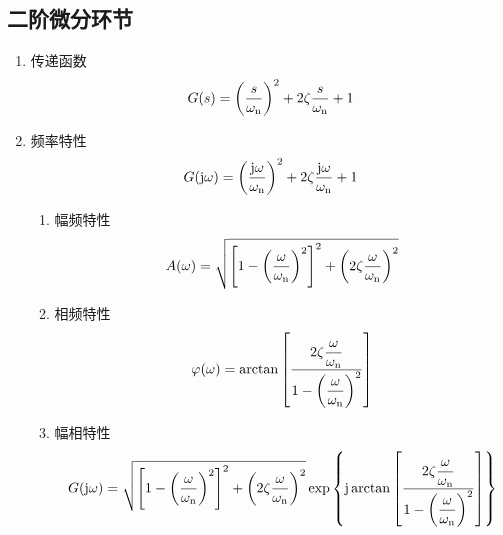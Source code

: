 \subsection{二阶微分环节}
\begin{enumerate}[1.]
	\item 传递函数
	\vspace*{-0.5em}
	\begin{align}
		G(s) = \left(\dfrac{s}{\omega_{\rm{n}}}\right)^2 + 2 \zeta \dfrac{s}{\omega_{\rm{n}}} + 1
	\end{align}
	\vspace*{-3em}
	
	\item 频率特性
	\vspace*{-0.5em}
	\begin{align}
		G(\text{j}  \omega) =  \left(\dfrac{\text{j} \omega}{\omega_{\rm{n}}}\right)^2 + 2 \zeta \dfrac{\text{j} \omega }{\omega_{\rm{n}}} + 1
	\end{align}
	\vspace*{-3em}
	\begin{enumerate}[(1) ]
		\item 幅频特性
		\vspace*{-0.5em}
		\begin{equation}
			A (\omega) = \sqrt{\left[1 - \left(\dfrac{\omega}{\omega_{\rm{n}}}\right)^2\right]^2 + \left(2 \zeta \dfrac{\omega}{\omega_{\rm{n}}}\right)^2}
		\end{equation}
			
		\item 相频特性
		\begin{align}
			\varphi(\omega) = \arctan \left[\dfrac{2 \zeta \dfrac{\omega}{\omega_{\rm{n}}}}{1 - \left(\dfrac{\omega}{\omega_{\rm{n}}}\right)^2}\right]
		\end{align}
		\vspace*{-1em}
		
		\item 幅相特性
		\vspace*{-0.5em}
		\begin{align}
			G(\text{j} \omega) = \sqrt{\left[1 - \left(\dfrac{\omega}{\omega_{\rm{n}}}\right)^2\right]^2 + \left(2 \zeta \dfrac{\omega}{\omega_{\rm{n}}}\right)^2} \exp\left\lbrace \text{j} \arctan \left[\dfrac{2 \zeta \dfrac{\omega}{\omega_{\rm{n}}}}{1 - \left(\dfrac{\omega}{\omega_{\rm{n}}}\right)^2}\right]\right\rbrace
		\end{align}
		\vspace*{-3em}
		

\end{enumerate}
\end{enumerate}
